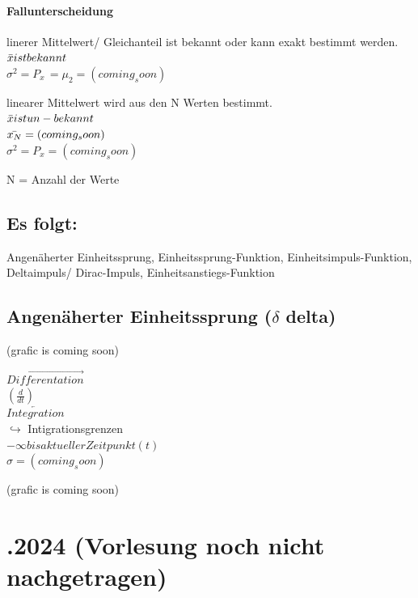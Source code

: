 \documentclass{article}
\begin{document}
\paragraph{Fallunterscheidung}
\begin{paracol}{2}
    linerer Mittelwert/ Gleichanteil ist bekannt oder kann exakt bestimmt werden. \\
    $\Bar{x} ist bekannt$ \\
    $\sigma^2 = P_{x~} = \mu_2 = (coming_soon)$
    
    \switchcolumn
    linearer Mittelwert wird aus den N Werten bestimmt. \\
    $\Bar{x} ist un-bekannt$ \\
    $\Bar{x_N} = (coming_soon)$ \\
    $\sigma^2 = P_x = (coming_soon)$
\end{paracol}
\begin{center} N = Anzahl der Werte \end{center}

\subsection*{Es folgt:}
Angenäherter Einheitssprung, Einheitssprung-Funktion, Einheitsimpuls-Funktion, Deltaimpuls/ Dirac-Impuls, Einheitsanstiegs-Funktion

\subsection*{Angenäherter Einheitssprung ($\delta$ delta)}
\begin{paracol}{3}
	(grafic is coming soon)

	\switchcolumn
	\begin{center}
    	$\overrightarrow{Differentation}$ \\
		$(\frac{d}{dt})$ \\
		\vspace{1em}
		$\overleftarrow{Integration}$ \\
		$\hookrightarrow$ Intigrationsgrenzen \\
		$-\infty bis aktueller Zeitpunkt (t)$ \\
		$\sigma = (coming_soon)$
	\end{center}

	\switchcolumn
	(grafic is coming soon)
\end{paracol}

\newpage
\section*{.2024 (Vorlesung noch nicht nachgetragen)}
\end{document}
